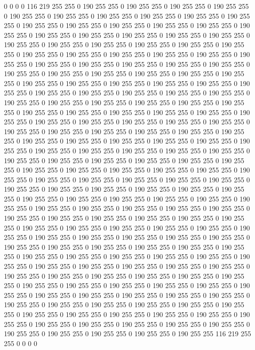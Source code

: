 0 0 0 0 116 219 255 255 0 190 255 255 0 190 255 255 0 190 255 255 0 190 255 255 0 190 255 255 0 190 255 255 0 190 255 255 0 190 255 255 0 190 255 255 0 190 255 255 0 190 255 255 0 190 255 255 0 190 255 255 0 190 255 255 0 190 255 255 0 190 255 255 0 190 255 255 0 190 255 255 0 190 255 255 0 190 255 255 0 190 255 255 0 190 255 255 0 190 255 255 0 190 255 255 0 190 255 255 0 190 255 255 0 190 255 255 0 190 255 255 0 190 255 255 0 190 255 255 0 190 255 255 0 190 255 255 0 190 255 255 0 190 255 255 0 190 255 255 0 190 255 255 0 190 255 255 0 190 255 255 0 190 255 255 0 190 255 255 0 190 255 255 0 190 255 255 0 190 255 255 0 190 255 255 0 190 255 255 0 190 255 255 0 190 255 255 0 190 255 255 
0 190 255 255 0 190 255 255 0 190 255 255 0 190 255 255 0 190 255 255 0 190 255 255 0 190 255 255 0 190 255 255 0 190 255 255 0 190 255 255 0 190 255 255 0 190 255 255 0 190 255 255 0 190 255 255 0 190 255 255 0 190 255 255 0 190 255 255 0 190 255 255 0 190 255 255 0 190 255 255 0 190 255 255 0 190 255 255 0 190 255 255 0 190 255 255 0 190 255 255 0 190 255 255 0 190 255 255 0 190 255 255 0 190 255 255 0 190 255 255 0 190 255 255 0 190 255 255 0 190 255 255 0 190 255 255 0 190 255 255 0 190 255 255 0 190 255 255 0 190 255 255 0 190 255 255 0 190 255 255 0 190 255 255 0 190 255 255 0 190 255 255 0 190 255 255 0 190 255 255 0 190 255 255 0 190 255 255 0 190 255 255 0 190 255 255 0 190 255 255 
0 190 255 255 0 190 255 255 0 190 255 255 0 190 255 255 0 190 255 255 0 190 255 255 0 190 255 255 0 190 255 255 0 190 255 255 0 190 255 255 0 190 255 255 0 190 255 255 0 190 255 255 0 190 255 255 0 190 255 255 0 190 255 255 0 190 255 255 0 190 255 255 0 190 255 255 0 190 255 255 0 190 255 255 0 190 255 255 0 190 255 255 0 190 255 255 0 190 255 255 0 190 255 255 0 190 255 255 0 190 255 255 0 190 255 255 0 190 255 255 0 190 255 255 0 190 255 255 0 190 255 255 0 190 255 255 0 190 255 255 0 190 255 255 0 190 255 255 0 190 255 255 0 190 255 255 0 190 255 255 0 190 255 255 0 190 255 255 0 190 255 255 0 190 255 255 0 190 255 255 0 190 255 255 0 190 255 255 0 190 255 255 0 190 255 255 0 190 255 255 
0 190 255 255 0 190 255 255 0 190 255 255 0 190 255 255 0 190 255 255 0 190 255 255 0 190 255 255 0 190 255 255 0 190 255 255 0 190 255 255 0 190 255 255 0 190 255 255 0 190 255 255 0 190 255 255 0 190 255 255 0 190 255 255 0 190 255 255 0 190 255 255 0 190 255 255 0 190 255 255 0 190 255 255 0 190 255 255 0 190 255 255 0 190 255 255 0 190 255 255 0 190 255 255 0 190 255 255 0 190 255 255 0 190 255 255 0 190 255 255 0 190 255 255 0 190 255 255 0 190 255 255 0 190 255 255 0 190 255 255 0 190 255 255 0 190 255 255 0 190 255 255 0 190 255 255 0 190 255 255 0 190 255 255 0 190 255 255 0 190 255 255 0 190 255 255 0 190 255 255 0 190 255 255 0 190 255 255 0 190 255 255 116 219 255 255 0 0 0 0 
